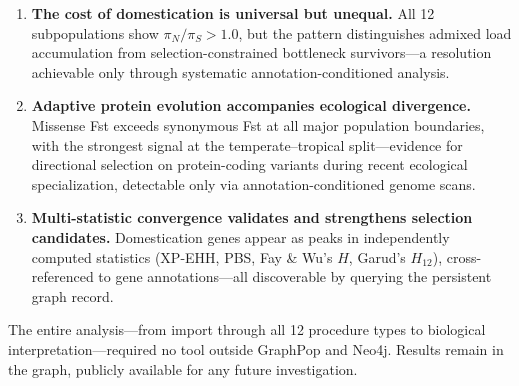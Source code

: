 \begin{enumerate}
\item \textbf{The cost of domestication is universal but unequal.} All 12 subpopulations show $\pi_N/\pi_S > 1.0$, but the pattern distinguishes admixed load accumulation from selection-constrained bottleneck survivors---a resolution achievable only through systematic annotation-conditioned analysis.

\item \textbf{Adaptive protein evolution accompanies ecological divergence.} Missense Fst exceeds synonymous Fst at all major population boundaries, with the strongest signal at the temperate--tropical split---evidence for directional selection on protein-coding variants during recent ecological specialization, detectable only via annotation-conditioned genome scans.

\item \textbf{Multi-statistic convergence validates and strengthens selection candidates.} Domestication genes appear as peaks in independently computed statistics (XP-EHH, PBS, Fay \& Wu's $H$, Garud's $H_{12}$), cross-referenced to gene annotations---all discoverable by querying the persistent graph record.
\end{enumerate}

The entire analysis---from import through all 12 procedure types to biological interpretation---required no tool outside GraphPop and Neo4j. Results remain in the graph, publicly available for any future investigation.
